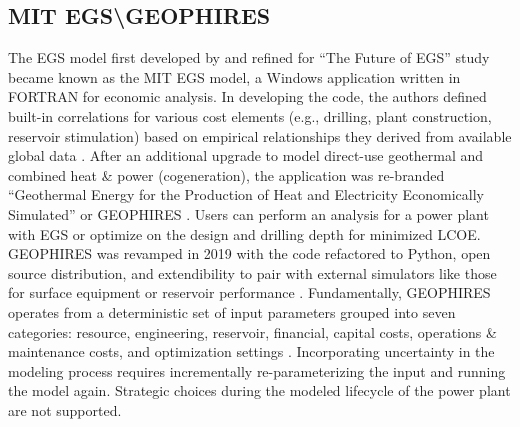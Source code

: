 \subsection{MIT EGS\textbackslash GEOPHIRES}\label{ch2:geophires}
The EGS model first developed by \citet{tester_economic_1990} and refined for “The Future of EGS” study \citep{tester_future_2006} became known as the MIT EGS model, a Windows application written in FORTRAN for economic analysis. In developing the code, the authors defined built-in correlations for various cost elements (e.g., drilling, plant construction, reservoir stimulation) based on empirical relationships they derived from available global data \citep{tester_future_2006}. After an additional upgrade to model direct-use geothermal and combined heat \& power (cogeneration), the application was re-branded “Geothermal Energy for the Production of Heat and Electricity Economically Simulated” or GEOPHIRES \citep{beckers_introducing_2013}. Users can perform an analysis for a power plant with EGS or optimize on the design and drilling depth for minimized LCOE. GEOPHIRES was revamped in 2019 with the code refactored to Python, open source distribution, and extendibility to pair with external simulators like those for surface equipment or reservoir performance \citep{beckers_geophires_2019}. Fundamentally, GEOPHIRES operates from a deterministic set of input parameters grouped into seven categories: resource, engineering, reservoir, financial, capital costs, operations \& maintenance costs, and optimization settings \citep{beckers_introducing_2013}. Incorporating uncertainty in the modeling process requires incrementally re-parameterizing the input and running the model again. Strategic choices during the modeled lifecycle of the power plant are not supported.

